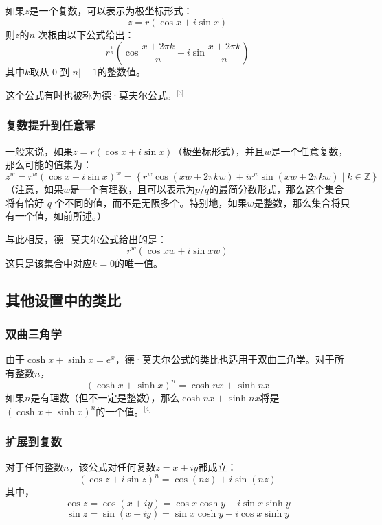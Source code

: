 如果\( z \)是一个复数，可以表示为极坐标形式：
\[
z = r \left( \cos x + i \sin x \right)~
\]
则\( z \)的\( n \)-次根由以下公式给出：
\[
r^{\frac{1}{n}} \left( \cos \frac{x + 2\pi k}{n} + i \sin \frac{x + 2\pi k}{n} \right)~
\]
其中\( k \)取从 0 到\( |n| - 1 \)的整数值。

这个公式有时也被称为德·莫夫尔公式。\(^\text{[3]}\)
\subsubsection{复数提升到任意幂}  
一般来说，如果\(z = r (\cos x + i \sin x)\)（极坐标形式），并且\(w\)是一个任意复数，那么可能的值集为：
\[
z^w = r^w \left( \cos x + i \sin x \right)^w = \left\{ r^w \cos \left( xw + 2\pi kw \right) + i r^w \sin \left( xw + 2\pi kw \right) \mid k \in \mathbb{Z} \right\}~
\]
（注意，如果\( w \)是一个有理数，且可以表示为\(p/q\)的最简分数形式，那么这个集合将有恰好 \( q \) 个不同的值，而不是无限多个。特别地，如果\( w \)是整数，那么集合将只有一个值，如前所述。）  

与此相反，德·莫夫尔公式给出的是：
\[
r^w (\cos xw + i \sin xw)~
\]
这只是该集合中对应\( k = 0 \)的唯一值。
\subsection{其他设置中的类比}  
\subsubsection{双曲三角学}  
由于\( \cosh x + \sinh x = e^x \)，德·莫夫尔公式的类比也适用于双曲三角学。对于所有整数\(n\)，
\[
(\cosh x + \sinh x)^n = \cosh nx + \sinh nx~
\]
如果\( n \)是有理数（但不一定是整数），那么\(\cosh nx + \sinh nx\)将是\( (\cosh x + \sinh x)^n \)的一个值。\(^\text{[4]}\)
\subsubsection{扩展到复数}  
对于任何整数\( n \)，该公式对任何复数\( z = x + iy \)都成立：
\[
(\cos z + i \sin z)^n = \cos(nz) + i \sin(nz)~
\]
其中，
\[
\cos z = \cos(x + iy) = \cos x \cosh y - i \sin x \sinh y~
\]
\[
\sin z = \sin(x + iy) = \sin x \cosh y + i \cos x \sinh y~
\]
